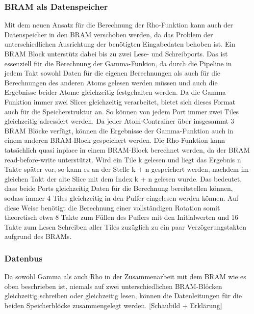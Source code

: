 \subsubsection{BRAM als Datenspeicher}
Mit dem neuen Ansatz für die Berechnung der Rho-Funktion kann auch der Datenspeicher in den BRAM verschoben werden, da das Problem der unterschiedlichen Ausrichtung der benötigten Eingabedaten behoben ist.
Ein BRAM Block unterstütz dabei bis zu zwei Lese- und Schreibports. Das ist essenziell für die Berechnung der Gamma-Funkion, da durch die Pipeline in jedem Takt sowohl Daten für die eigenen Berechnungen als
auch für die Berechnungen des anderen Atoms gelesen werden müssen und auch die Ergebnisse beider Atome gleichzeitig festgehalten werden.
Da die Gamma-Funktion immer zwei Slices gleichzeitig verarbeitet, bietet sich dieses Format auch für die Speicherstruktur an. So können von jedem Port immer zwei Tiles gleichzeitig adressiert werden.
Da jeder Atom-Contrainer über insgesammt 3 BRAM Blöcke verfügt, können die Ergebnisse der Gamma-Funktion auch in einem anderen BRAM-Block gespeichert werden.
Die Rho-Funktion kann tatsächlich quasi inplace in einem BRAM-Block berechnet werden, da der BRAM read-before-write unterstützt. Wird ein Tile k gelesen und liegt das Ergebnis n Takte später vor,
so kann es an der Stelle k + n gespeichert werden, nachdem im gleichen Takt der alte Slice mit dem Index k + n gelesen wurde.
Das bedeutet, dass beide Ports gleichzeitig Daten für die Berechnung bereitstellen können, sodass immer 4 Tiles gleichzeitig in den Puffer eingelesen werden können.
Auf diese Weise benötigt die Berechnung einer vollständigen Rotation somit theoretisch etwa 8 Takte zum Füllen des Puffers mit den Initialwerten und 16 Takte zum Lesen Schreiben aller Tiles zuzüglich
zu ein paar Verzögerungstakten aufgrund des BRAMs.

\subsubsection{Datenbus}
Da sowohl Gamma als auch Rho in der Zusammenarbeit mit dem BRAM wie es oben beschrieben ist, niemals auf zwei unterschiedlichen BRAM-Blöcken gleichzeitig schreiben oder gleichzeitig lesen,
können die Datenleitungen für die beiden Speicherblöcke zusammengelegt werden.
[Schaubild + Erklärung]

